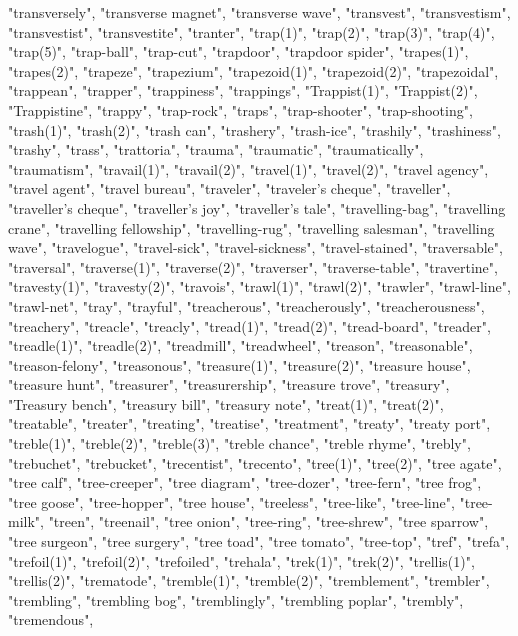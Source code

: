 "transversely",
"transverse magnet",
"transverse wave",
"transvest",
"transvestism",
"transvestist",
"transvestite",
"tranter",
"trap(1)",
"trap(2)",
"trap(3)",
"trap(4)",
"trap(5)",
"trap-ball",
"trap-cut",
"trapdoor",
"trapdoor spider",
"trapes(1)",
"trapes(2)",
"trapeze",
"trapezium",
"trapezoid(1)",
"trapezoid(2)",
"trapezoidal",
"trappean",
"trapper",
"trappiness",
"trappings",
"Trappist(1)",
"Trappist(2)",
"Trappistine",
"trappy",
"trap-rock",
"traps",
"trap-shooter",
"trap-shooting",
"trash(1)",
"trash(2)",
"trash can",
"trashery",
"trash-ice",
"trashily",
"trashiness",
"trashy",
"trass",
"trattoria",
"trauma",
"traumatic",
"traumatically",
"traumatism",
"travail(1)",
"travail(2)",
"travel(1)",
"travel(2)",
"travel agency",
"travel agent",
"travel bureau",
"traveler",
"traveler's cheque",
"traveller",
"traveller's cheque",
"traveller's joy",
"traveller's tale",
"travelling-bag",
"travelling crane",
"travelling fellowship",
"travelling-rug",
"travelling salesman",
"travelling wave",
"travelogue",
"travel-sick",
"travel-sickness",
"travel-stained",
"traversable",
"traversal",
"traverse(1)",
"traverse(2)",
"traverser",
"traverse-table",
"travertine",
"travesty(1)",
"travesty(2)",
"travois",
"trawl(1)",
"trawl(2)",
"trawler",
"trawl-line",
"trawl-net",
"tray",
"trayful",
"treacherous",
"treacherously",
"treacherousness",
"treachery",
"treacle",
"treacly",
"tread(1)",
"tread(2)",
"tread-board",
"treader",
"treadle(1)",
"treadle(2)",
"treadmill",
"treadwheel",
"treason",
"treasonable",
"treason-felony",
"treasonous",
"treasure(1)",
"treasure(2)",
"treasure house",
"treasure hunt",
"treasurer",
"treasurership",
"treasure trove",
"treasury",
"Treasury bench",
"treasury bill",
"treasury note",
"treat(1)",
"treat(2)",
"treatable",
"treater",
"treating",
"treatise",
"treatment",
"treaty",
"treaty port",
"treble(1)",
"treble(2)",
"treble(3)",
"treble chance",
"treble rhyme",
"trebly",
"trebuchet",
"trebucket",
"trecentist",
"trecento",
"tree(1)",
"tree(2)",
"tree agate",
"tree calf",
"tree-creeper",
"tree diagram",
"tree-dozer",
"tree-fern",
"tree frog",
"tree goose",
"tree-hopper",
"tree house",
"treeless",
"tree-like",
"tree-line",
"tree-milk",
"treen",
"treenail",
"tree onion",
"tree-ring",
"tree-shrew",
"tree sparrow",
"tree surgeon",
"tree surgery",
"tree toad",
"tree tomato",
"tree-top",
"tref",
"trefa",
"trefoil(1)",
"trefoil(2)",
"trefoiled",
"trehala",
"trek(1)",
"trek(2)",
"trellis(1)",
"trellis(2)",
"trematode",
"tremble(1)",
"tremble(2)",
"tremblement",
"trembler",
"trembling",
"trembling bog",
"tremblingly",
"trembling poplar",
"trembly",
"tremendous",
